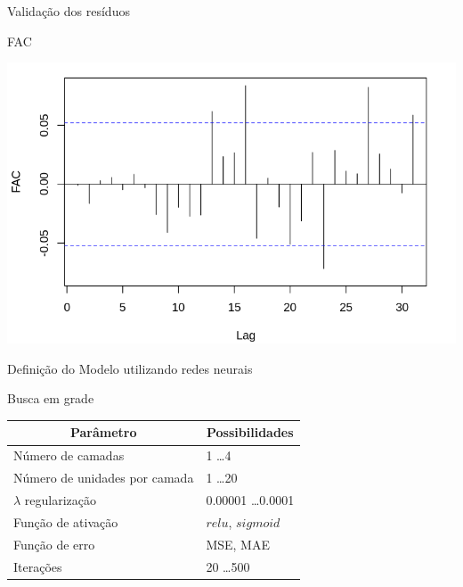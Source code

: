 \documentclass[compress,aspectratio=149,brazil]{beamer}
\begin{document}
\begin{frame}{Validação dos resíduos}
    \begin{block}{FAC}
        \begin{center}
            \includegraphics[width=.8\linewidth]{../images/residuals_FAC.png}
        \end{center}
    \end{block}
\end{frame}

\begin{frame}{Definição do Modelo utilizando redes neurais}
    \begin{block}{Busca em grade}
        \begin{center}
            \begin{tabular}{l l}
            \multicolumn{1}{c}{Parâmetro}        & \multicolumn{1}{c}{Possibilidades}  \\
                \toprule
                Número de camadas                & 1 \ldots 4                          \\
                Número de unidades por camada    & 1 \ldots 20                         \\
                $\lambda$ regularização          & 0.00001 \ldots 0.0001               \\
                Função de ativação               & $relu$, $sigmoid$                   \\
                Função de erro                   & MSE, MAE                            \\
                Iterações                        & 20 \ldots 500
            \end{tabular}
        \end{center}
    \end{block}
\end{frame}
\end{document}
